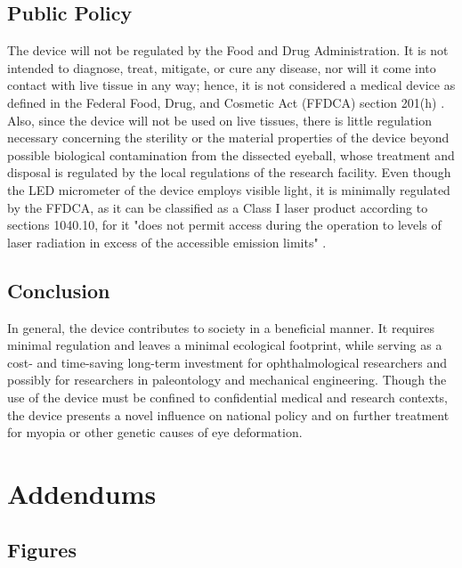 \documentclass{article}
\begin{document}
 
\subsection{Public Policy}
\label{sec:Public Policy}
 
The device will not be regulated by the Food and Drug
Administration. It is not intended to diagnose, treat, mitigate, or
cure any disease, nor will it come into contact with live tissue in
any way; hence, it is not considered a medical device as defined in
the Federal Food, Drug, and Cosmetic Act (FFDCA) section 201(h)
\cite{fdaguidelines}. Also, since the device will not be used on live
tissues, there is little regulation necessary concerning the sterility
or the material properties of the device beyond possible biological
contamination from the dissected eyeball, whose treatment and disposal
is regulated by the local regulations of the research facility.  Even
though the LED micrometer of the device employs visible light, it is
minimally regulated by the FFDCA, as it can be classified as a Class I
laser product according to sections 1040.10, for it "does not permit
access during the operation to levels of laser radiation in excess of
the accessible emission limits" \cite{fdaguidelines}.
 
 
\subsection{Conclusion}
\label{sec:Conclusion}

In general, the device contributes to society in a beneficial
manner. It requires minimal regulation and leaves a minimal ecological
footprint, while serving as a cost- and time-saving long-term
investment for ophthalmological researchers and possibly for
researchers in paleontology and mechanical engineering.  Though the
use of the device must be confined to confidential medical and
research contexts, the device presents a novel influence on national
policy and on further treatment for myopia or other genetic causes of
eye deformation.

\section{Addendums}
\label{sec:addendums}

\subsection{Figures}
\label{sec:figures}
\end{document}
